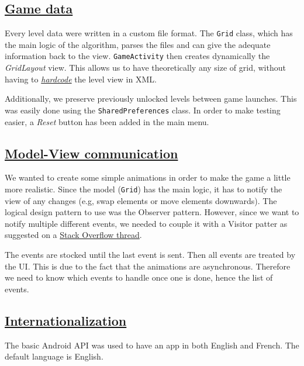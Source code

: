 \documentclass{article}
\begin{document}
\subsection{\href{http://31.media.tumblr.com/45b4d84ab9018d9f65a7a25c60775ec7/tumblr_nc122coAXY1rpco88o1_400.gif}{Game data}}

Every level data were written in a custom file format. The \texttt{Grid} class, which has the main logic of the algorithm, parses the files and can give the adequate information back to the view. \texttt{GameActivity} then creates dynamically the \textit{GridLayout} view. This allows us to have theoretically any size of grid, without having to \href{http://tclhost.com/f7IaLC9.gif}{\textit{hardcode}} the level view in XML.

Additionally, we preserve previously unlocked levels between game launches. This was easily done using the \texttt{SharedPreferences} class. In order to make testing easier, a \textit{Reset} button has been added in the main menu.

\subsection{\href{https://collegecandy.files.wordpress.com/2016/11/48e3110b48be34105f10b2114adaf860bf2a0f18.gif?w=750}{Model-View communication}}

We wanted to create some simple animations in order to make the game a little more realistic. Since the model (\texttt{Grid}) has the main logic, it has to notify the view of any changes (e.g, swap elements or move elements downwards). The logical design pattern to use was the Observer pattern. However, since we want to notify multiple different events, we needed to couple it with a Visitor patter as suggested on a \href{http://stackoverflow.com/a/6608600/5795409}{Stack Overflow thread}.

The events are stocked until the last event is sent. Then all events are treated by the UI. This is due to the fact that the animations are asynchronous. Therefore we need to know which events to handle once one is done, hence the list of events.

\subsection{\href{https://media.giphy.com/media/bGvS8e3N9sh5S/giphy.gif}{Internationalization}}

The basic Android API was used to have an app in both English and French. The default language is English.
\end{document}

